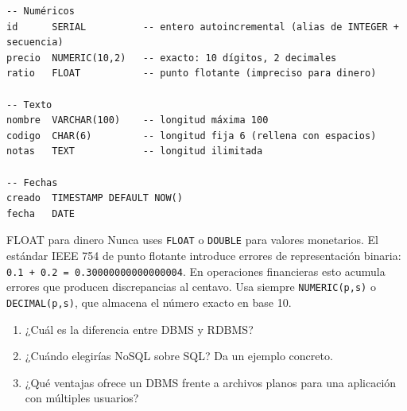 \begin{lstlisting}[caption={Tipos de datos comunes}]
-- Numéricos
id      SERIAL          -- entero autoincremental (alias de INTEGER + secuencia)
precio  NUMERIC(10,2)   -- exacto: 10 dígitos, 2 decimales
ratio   FLOAT           -- punto flotante (impreciso para dinero)

-- Texto
nombre  VARCHAR(100)    -- longitud máxima 100
codigo  CHAR(6)         -- longitud fija 6 (rellena con espacios)
notas   TEXT            -- longitud ilimitada

-- Fechas
creado  TIMESTAMP DEFAULT NOW()
fecha   DATE
\end{lstlisting}

\begin{warningbox}{FLOAT para dinero}
Nunca uses \texttt{FLOAT} o \texttt{DOUBLE} para valores monetarios. El estándar IEEE 754 de punto flotante introduce errores de representación binaria: \texttt{0.1 + 0.2 = 0.30000000000000004}.
En operaciones financieras esto acumula errores que producen discrepancias al centavo.
Usa siempre \texttt{NUMERIC(p,s)} o \texttt{DECIMAL(p,s)}, que almacena el número exacto en base 10.
\end{warningbox}

\begin{entrevistabox}
\begin{enumerate}
  \item ¿Cuál es la diferencia entre DBMS y RDBMS?
  \item ¿Cuándo elegirías NoSQL sobre SQL? Da un ejemplo concreto.
  \item ¿Qué ventajas ofrece un DBMS frente a archivos planos para una aplicación con múltiples usuarios?
\end{enumerate}
\end{entrevistabox}
